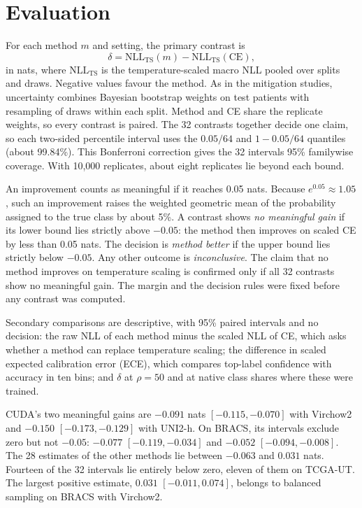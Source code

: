 \documentclass[11pt]{article}
\begin{document}
\section{Evaluation}
\label{sec:evaluation}
For each method $m$ and setting, the primary contrast is
\begin{equation}
\delta = \mathrm{NLL}_{\mathrm{TS}}(m) - \mathrm{NLL}_{\mathrm{TS}}(\mathrm{CE}),
\end{equation}
in nats, where $\mathrm{NLL}_{\mathrm{TS}}$ is the temperature-scaled macro NLL pooled over splits and draws. Negative values favour the method. As in the mitigation studies, uncertainty combines Bayesian bootstrap weights on test patients \citep{rubin1981bayesian} with resampling of draws within each split. Method and CE share the replicate weights, so every contrast is paired. The 32 contrasts together decide one claim, so each two-sided percentile interval uses the $0.05/64$ and $1-0.05/64$ quantiles (about 99.84\%). This Bonferroni correction gives the 32 intervals 95\% familywise coverage. With 10,000 replicates, about eight replicates lie beyond each bound.

An improvement counts as meaningful if it reaches 0.05 nats. Because $e^{0.05}\approx1.05$, such an improvement raises the weighted geometric mean of the probability assigned to the true class by about 5\%. A contrast shows \emph{no meaningful gain} if its lower bound lies strictly above $-0.05$: the method then improves on scaled CE by less than 0.05 nats. The decision is \emph{method better} if the upper bound lies strictly below $-0.05$. Any other outcome is \emph{inconclusive}. The claim that no method improves on temperature scaling is confirmed only if all 32 contrasts show no meaningful gain. The margin and the decision rules were fixed before any contrast was computed.

Secondary comparisons are descriptive, with 95\% paired intervals and no decision: the raw NLL of each method minus the scaled NLL of CE, which asks whether a method can replace temperature scaling; the difference in scaled expected calibration error (ECE), which compares top-label confidence with accuracy in ten bins; and $\delta$ at $\rho=50$ and at native class shares where these were trained.



CUDA's two meaningful gains are $-0.091$ nats $[-0.115, -0.070]$ with Virchow2 and $-0.150$ $[-0.173, -0.129]$ with UNI2-h. On BRACS, its intervals exclude zero but not $-0.05$: $-0.077$ $[-0.119, -0.034]$ and $-0.052$ $[-0.094, -0.008]$. The 28 estimates of the other methods lie between $-0.063$ and $0.031$ nats. Fourteen of the 32 intervals lie entirely below zero, eleven of them on TCGA-UT. The largest positive estimate, $0.031$ $[-0.011, 0.074]$, belongs to balanced sampling on BRACS with Virchow2.
\end{document}

